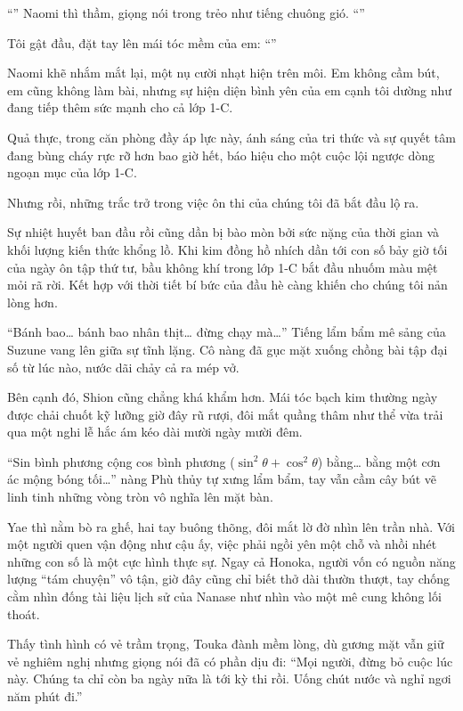 \documentclass[../main.tex]{subfiles}
\begin{document}
``'' Naomi thì thầm, giọng nói trong trẻo như tiếng chuông gió. ``''

Tôi gật đầu, đặt tay lên mái tóc mềm của em: ``''

Naomi khẽ nhắm mắt lại, một nụ cười nhạt hiện trên môi. Em không cầm bút, em cũng không làm bài, nhưng sự hiện diện bình yên của em cạnh tôi dường như đang tiếp thêm sức mạnh cho cả lớp 1-C.

Quả thực, trong căn phòng đầy áp lực này, ánh sáng của tri thức và sự quyết tâm đang bùng cháy rực rỡ hơn bao giờ hết, báo hiệu cho một cuộc lội ngược dòng ngoạn mục của lớp 1-C.

\ct

Nhưng rồi, những trắc trở trong việc ôn thi của chúng tôi đã bắt đầu lộ ra.

Sự nhiệt huyết ban đầu rồi cũng dần bị bào mòn bởi sức nặng của thời gian và khối lượng kiến thức khổng lồ. Khi kim đồng hồ nhích dần tới con số bảy giờ tối của ngày ôn tập thứ tư, bầu không khí trong lớp 1-C bắt đầu nhuốm màu mệt mỏi rã rời. Kết hợp với thời tiết bí bức của đầu hè càng khiến cho chúng tôi nản lòng hơn.

``Bánh bao\dots{} bánh bao nhân thịt\dots{} đừng chạy mà\dots{}''  Tiếng lẩm bẩm mê sảng của Suzune vang lên giữa sự tĩnh lặng. Cô nàng đã gục mặt xuống chồng bài tập đại số từ lúc nào, nước dãi chảy cả ra mép vở.

Bên cạnh đó, Shion cũng chẳng khá khẩm hơn. Mái tóc bạch kim thường ngày được chải chuốt kỹ lưỡng giờ đây rũ rượi, đôi mắt quầng thâm như thể vừa trải qua một nghi lễ hắc ám kéo dài mười ngày mười đêm.

``Sin bình phương cộng cos bình phương ($\sin^2\theta+\cos^2\theta$) bằng\dots{} bằng một cơn ác mộng bóng tối\dots{}'' nàng Phù thủy tự xưng lẩm bẩm, tay vẫn cầm cây bút vẽ linh tinh những vòng tròn vô nghĩa lên mặt bàn.

Yae thì nằm bò ra ghế, hai tay buông thõng, đôi mắt lờ đờ nhìn lên trần nhà. Với một người quen vận động như cậu ấy, việc phải ngồi yên một chỗ và nhồi nhét những con số là một cực hình thực sự. Ngay cả Honoka, người vốn có nguồn năng lượng ``tám chuyện'' vô tận, giờ đây cũng chỉ biết thở dài thườn thượt, tay chống cằm nhìn đống tài liệu lịch sử của Nanase như nhìn vào một mê cung không lối thoát.

Thấy tình hình có vẻ trầm trọng, Touka đành mềm lòng, dù gương mặt vẫn giữ vẻ nghiêm nghị nhưng giọng nói đã có phần dịu đi: ``Mọi người, đừng bỏ cuộc lúc này. Chúng ta chỉ còn ba ngày nữa là tới kỳ thi rồi. Uống chút nước và nghỉ ngơi năm phút đi.''
\end{document}
